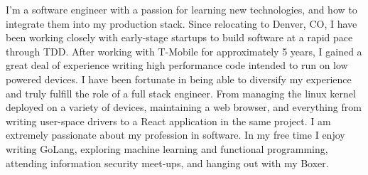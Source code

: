 \begin{cvparagraph}
  \center
  I’m a software engineer with a passion for learning new technologies, and how to integrate them into my production stack. Since
  relocating to Denver, CO, I have been working closely with early-stage startups to build software at a rapid pace
  through TDD. After working with T-Mobile for approximately 5 years, I gained a great deal of experience writing high
  performance code intended to run on low powered devices. I have been fortunate in being able to diversify my
  experience and truly fulfill the role of a full stack engineer. From managing the linux kernel deployed on a variety of
  devices, maintaining a web browser, and everything from writing user-space drivers to a React application in the same
  project. I am extremely passionate about my profession in software. In my free time I enjoy writing GoLang, exploring
  machine learning and functional programming, attending information security meet-ups, and hanging out with my Boxer.
\end{cvparagraph}

